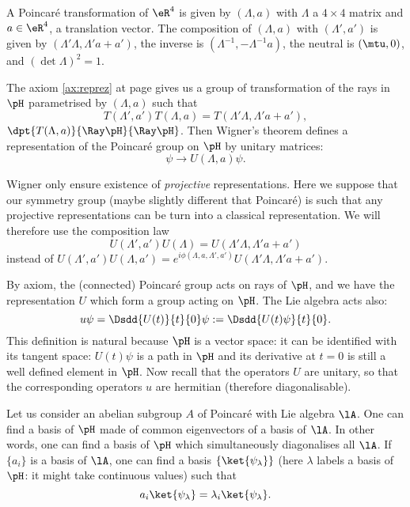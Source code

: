 A Poincaré transformation of $\eR^4$ is given by $(\Lambda,a)$ with $\Lambda$ a $4\times 4$ matrix and $a\in\eR^4$, a translation vector. The composition of $(\Lambda,a)$ with $(\Lambda',a')$ is given by $(\Lambda'\Lambda,\Lambda'a+a')$, the inverse is $(\Lambda^{-1},-\Lambda^{-1} a)$, the neutral is $(\mtu,0)$, and $(\det\Lambda)^2=1$.

The axiom \ref{ax:reprez} at page \pageref{pg:axiomes} gives us a group of transformation of the rays in $\pH$ parametrised by $(\Lambda,a)$ such that
\begin{equation}
  T(\Lambda',a')T(\Lambda,a)=T(\Lambda'\Lambda,\Lambda'a+a'),
\end{equation}
$\dpt{T(\Lambda,a)}{\Ray \pH}{\Ray \pH}$. Then Wigner's theorem defines a representation of the Poincaré group on $\pH$ by unitary matrices:
\[
\psi\to U(\Lambda,a)\psi.
\]

\begin{remark}
Wigner only ensure existence of \emph{projective} representations. Here we suppose that our symmetry group (maybe slightly different that Poincaré) is such that any projective representations can be turn into a classical representation. We will therefore use the composition law
\begin{equation}\label{eq:composition_U}
  U(\Lambda',a')U(\Lambda)=U(\Lambda'\Lambda,\Lambda'a+a')
\end{equation}
instead of $U(\Lambda',a')U(\Lambda,a')=e^{i\phi(\Lambda,a,\Lambda',a')}U(\Lambda'\Lambda,\Lambda'a+a')$.
\end{remark}

By axiom, the (connected) Poincaré group acts on rays of $\pH$, and we have the representation $U$ which form a group acting on $\pH$. The Lie algebra acts also:
\begin{equation}
u\psi=\Dsdd{U(t)}{t}{0}\psi:=\Dsdd{U(t)\psi}{t}{0}.
\end{equation}
This definition is natural because $\pH$ is a vector space: it can be identified with its tangent space: $U(t)\psi$ is a path in $\pH$ and its derivative at $t=0$ is still a well defined element in $\pH$. Now recall that the operators $U$ are unitary, so that the corresponding operators $u$ are hermitian (therefore diagonalisable).

Let us consider an abelian subgroup $A$ of Poincaré with Lie algebra $\lA$. One can find a basis of $\pH$ made of common eigenvectors of a basis of $\lA$. In other words, one can find a basis of $\pH$ which simultaneously diagonalises all $\lA$. If $\{a_i\}$ is a basis of $\lA$, one can find a basis $\{\ket{\psi_{\lambda}}\}$ (here $\lambda$ labels a basis of $\pH$: it might take continuous values) such that
\begin{equation}
   a_i\ket{\psi_{\lambda}}=\lambda_i\ket{\psi_{\lambda}}.
\end{equation}


